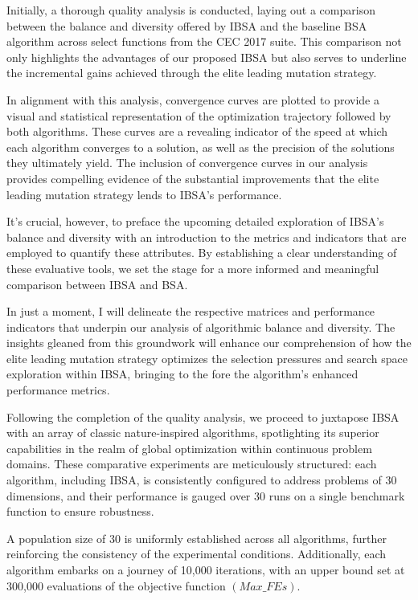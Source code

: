 \documentclass{article} %
\begin{document}
Initially, a thorough quality analysis is conducted, laying out a comparison between the balance and diversity offered by IBSA and the baseline BSA algorithm across select functions from the CEC 2017 suite. This comparison not only highlights the advantages of our proposed IBSA but also serves to underline the incremental gains achieved through the elite leading mutation strategy.

In alignment with this analysis, convergence curves are plotted to provide a visual and statistical representation of the optimization trajectory followed by both algorithms. These curves are a revealing indicator of the speed at which each algorithm converges to a solution, as well as the precision of the solutions they ultimately yield. The inclusion of convergence curves in our analysis provides compelling evidence of the substantial improvements that the elite leading mutation strategy lends to IBSA's performance.

It's crucial, however, to preface the upcoming detailed exploration of IBSA's balance and diversity with an introduction to the metrics and indicators that are employed to quantify these attributes. By establishing a clear understanding of these evaluative tools, we set the stage for a more informed and meaningful comparison between IBSA and BSA.

In just a moment, I will delineate the respective matrices and performance indicators that underpin our analysis of algorithmic balance and diversity. The insights gleaned from this groundwork will enhance our comprehension of how the elite leading mutation strategy optimizes the selection pressures and search space exploration within IBSA, bringing to the fore the algorithm's enhanced performance metrics.

Following the completion of the quality analysis, we proceed to juxtapose IBSA with an array of classic nature-inspired algorithms, spotlighting its superior capabilities in the realm of global optimization within continuous problem domains. These comparative experiments are meticulously structured: each algorithm, including IBSA, is consistently configured to address problems of 30 dimensions, and their performance is gauged over 30 runs on a single benchmark function to ensure robustness.

A population size of 30 is uniformly established across all algorithms, further reinforcing the consistency of the experimental conditions. Additionally, each algorithm embarks on a journey of 10,000 iterations, with an upper bound set at 300,000 evaluations of the objective function $(Max\_FEs)$.
\end{document}

